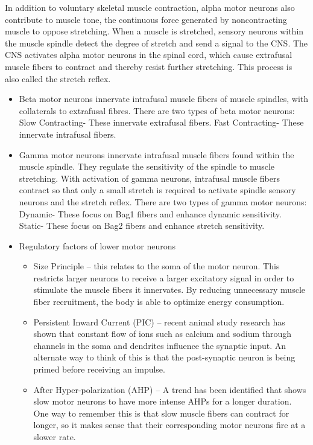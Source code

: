 \documentclass[]{book}
\providecommand{\tightlist}{%
  \setlength{\itemsep}{0pt}\setlength{\parskip}{0pt}}
\begin{document}
In addition to voluntary skeletal muscle contraction, alpha motor neurons also contribute to muscle tone, the continuous force generated by noncontracting muscle to oppose stretching. When a muscle is stretched, sensory neurons within the muscle spindle detect the degree of stretch and send a signal to the CNS. The CNS activates alpha motor neurons in the spinal cord, which cause extrafusal muscle fibers to contract and thereby resist further stretching. This process is also called the stretch reflex.

\begin{itemize}
\tightlist
\item
  Beta motor neurons innervate intrafusal muscle fibers of muscle spindles, with collaterals to extrafusal fibres. There are two types of beta motor neurons: Slow Contracting- These innervate extrafusal fibers. Fast Contracting- These innervate intrafusal fibers.
\item
  Gamma motor neurons innervate intrafusal muscle fibers found within the muscle spindle. They regulate the sensitivity of the spindle to muscle stretching. With activation of gamma neurons, intrafusal muscle fibers contract so that only a small stretch is required to activate spindle sensory neurons and the stretch reflex. There are two types of gamma motor neurons: Dynamic- These focus on Bag1 fibers and enhance dynamic sensitivity. Static- These focus on Bag2 fibers and enhance stretch sensitivity.
\item
  Regulatory factors of lower motor neurons

  \begin{itemize}
  \tightlist
  \item
    Size Principle -- this relates to the soma of the motor neuron. This restricts larger neurons to receive a larger excitatory signal in order to stimulate the muscle fibers it innervates. By reducing unnecessary muscle fiber recruitment, the body is able to optimize energy consumption.
  \item
    Persistent Inward Current (PIC) -- recent animal study research has shown that constant flow of ions such as calcium and sodium through channels in the soma and dendrites influence the synaptic input. An alternate way to think of this is that the post-synaptic neuron is being primed before receiving an impulse.
  \item
    After Hyper-polarization (AHP) -- A trend has been identified that shows slow motor neurons to have more intense AHPs for a longer duration. One way to remember this is that slow muscle fibers can contract for longer, so it makes sense that their corresponding motor neurons fire at a slower rate.
  \end{itemize}
\end{itemize}
\end{document}
